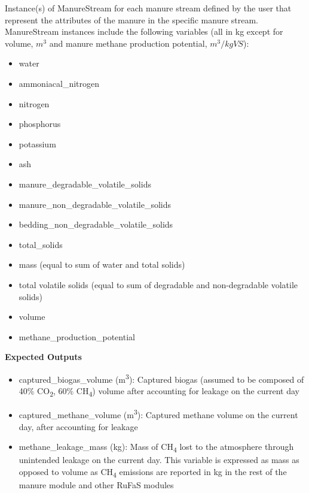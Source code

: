 \begin{refsection}
Instance(s) of ManureStream for each manure stream defined by the user that represent the attributes of the manure in the specific manure stream. ManureStream instances include the following variables (all in kg except for volume, \(m^3\) and manure methane production potential, \(m^3 / kgVS\)):
    \begin{itemize}
        \item water 
        \item ammoniacal\_nitrogen
        \item nitrogen 
        \item phosphorus
        \item potassium
        \item ash
        \item manure\_degradable\_volatile\_solids
        \item manure\_non\_degradable\_volatile\_solids
        \item bedding\_non\_degradable\_volatile\_solids
        \item total\_solids
        \item mass (equal to sum of water and total solids)
        \item total volatile solids (equal to sum of degradable and non-degradable volatile solids)
        \item volume
        \item methane\_production\_potential
\end{itemize}
\vspace{0.5cm}

\textbf{Expected Outputs}
\vspace{0.2cm}

\begin{itemize}
    \item captured\_biogas\_volume (m\textsuperscript{3}): Captured biogas (assumed to be composed of 40\% CO\textsubscript{2}, 60\% CH\textsubscript{4}) volume after accounting for leakage on the current day
    \item captured\_methane\_volume (m\textsuperscript{3}): Captured methane volume on the current day, after accounting for leakage
    \item methane\_leakage\_mass (kg): Mass of CH\textsubscript{4} lost to the atmosphere through unintended leakage on the current day. This variable is expressed as mass as opposed to volume as CH\textsubscript{4} emissions are reported in kg in the rest of the manure module and other RuFaS modules


\end{itemize}
\end{refsection}
